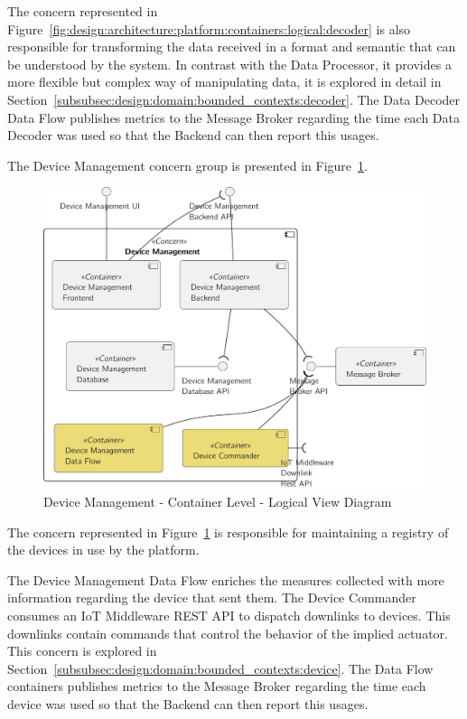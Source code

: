 The concern represented in Figure~\ref{fig:design:architecture:platform:containers:logical:decoder} is also responsible for transforming the data received in a format and semantic that can be understood by the system. In contrast with the Data Processor, it provides a more flexible but complex way of manipulating data, it is explored in detail in Section~\ref{subsubsec:design:domain:bounded_contexts:decoder}. The Data Decoder Data Flow publishes metrics to the Message Broker regarding the time each Data Decoder was used so that the Backend can then report this usages.

The Device Management concern group is presented in Figure~\ref{fig:design:architecture:platform:containers:logical:device}.

\begin{figure}[H]
   \centering
   \includegraphics[page=1,width=0.8\columnwidth]{assets/diagrams/design/architectural/level2/logical/device-management-context.pdf}
   \caption[Device Management - Container Level - Logical View Diagram]{Device Management - Container Level - Logical View Diagram}
   \label{fig:design:architecture:platform:containers:logical:device}
\end{figure}

The concern represented in Figure~\ref{fig:design:architecture:platform:containers:logical:device} is responsible for maintaining a registry of the devices in use by the platform.

The Device Management Data Flow enriches the measures collected with more information regarding the device that sent them. The Device Commander consumes an \gls{IoT} Middleware REST \gls{API} to dispatch downlinks to devices. This downlinks contain commands that control the behavior of the implied actuator.
This concern is explored in Section~\ref{subsubsec:design:domain:bounded_contexts:device}. The Data Flow containers publishes metrics to the Message Broker regarding the time each device was used so that the Backend can then report this usages.

